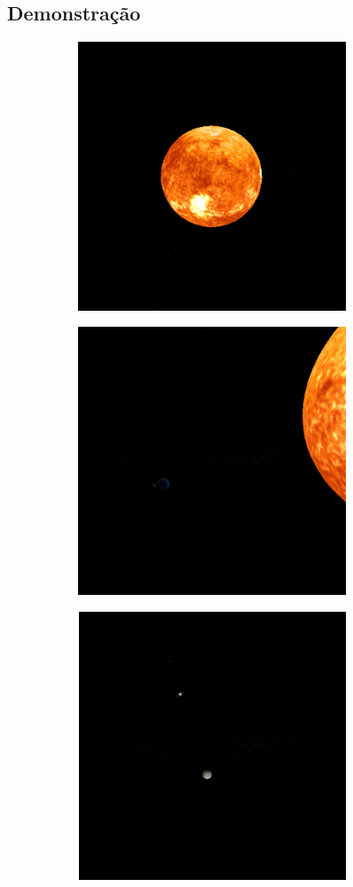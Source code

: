 \documentclass[11pt,a4paper]{report}
\begin{document}
\subsection{Demonstração}
\vspace{1cm}
\begin{figure}[H]
\centering
\begin{subfigure}{0.5\textwidth}
  \centering
  \includegraphics[width = 8cm,height = 8cm]{sun.png}
  \caption{\texttt{}}
  \label{fig:sun}
\end{subfigure}%
\begin{subfigure}{0.5\textwidth}
  \centering
  \includegraphics[width = 8cm,height = 8cm]{earth.png}
  \caption{\texttt{}}
  \label{fig:earth}
\end{subfigure}
\begin{subfigure}{0.5\textwidth}
  \centering
  \includegraphics[width = 8cm,height = 8cm]{jupiter.png}

\end{subfigure}
\end{figure}
\end{document}
